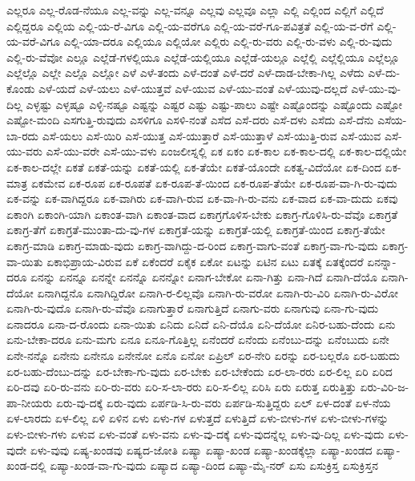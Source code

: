 {ಎಲ್ಲರೂ
ಎಲ್ಲ-ರೊಡ-ನೆಯೂ
ಎಲ್ಲ-ವನ್ನು
ಎಲ್ಲ-ವನ್ನೂ
ಎಲ್ಲವು
ಎಲ್ಲವೂ
ಎಲ್ಲಾ
ಎಲ್ಲಿ
ಎಲ್ಲಿಂದ
ಎಲ್ಲಿಗೆ
ಎಲ್ಲಿದೆ
ಎಲ್ಲಿದ್ದರೂ
ಎಲ್ಲಿಯ
ಎಲ್ಲಿ-ಯ-ರೆ-ವಿಗೂ
ಎಲ್ಲಿ-ಯ-ವರೆಗೂ
ಎಲ್ಲಿ-ಯ-ವರೆ-ಗೂ-ಪವಿತ್ರತೆ
ಎಲ್ಲಿ-ಯ-ವ-ರೆಗೆ
ಎಲ್ಲಿ-ಯ-ವರೆ-ವಿಗೂ
ಎಲ್ಲಿ-ಯಾ-ದರೂ
ಎಲ್ಲಿಯೂ
ಎಲ್ಲಿಯೋ
ಎಲ್ಲಿರು
ಎಲ್ಲಿ-ರು-ವರು
ಎಲ್ಲಿ-ರು-ವಳು
ಎಲ್ಲಿ-ರು-ವುದು
ಎಲ್ಲಿ-ರು-ವೆವೋ
ಎಲ್ಲೂ
ಎಲ್ಲೆಡೆ-ಗಳಲ್ಲಿಯೂ
ಎಲ್ಲೆಡೆ-ಯಲ್ಲಿಯೂ
ಎಲ್ಲೆಡೆ-ಯಲ್ಲೂ
ಎಲ್ಲೆಲ್ಲಿ
ಎಲ್ಲೆಲ್ಲಿಯೂ
ಎಲ್ಲೆಲ್ಲೂ
ಎಲ್ಲೆಲ್ಲೊ
ಎಲ್ಲೇ
ಎಲ್ಲೊ
ಎಲ್ಲೋ
ಎಳೆ
ಎಳೆ-ತಂದು
ಎಳೆ-ದಂತೆ
ಎಳೆ-ದರೆ
ಎಳೆ-ದಾಡ-ಬೇಕಾ-ಗಿಲ್ಲ
ಎಳೆದು
ಎಳೆ-ದು-ಕೊಂಡು
ಎಳೆ-ಯದೆ
ಎಳೆ-ಯಲು
ಎಳೆ-ಯುತ್ತವೆ
ಎಳೆ-ಯುವ
ಎಳೆ-ಯು-ವಂತೆ
ಎಳೆ-ಯುವು-ದಲ್ಲದೆ
ಎಳೆ-ಯು-ವು-ದಿಲ್ಲ
ಎಳ್ಳಷ್ಟು
ಎಳ್ಳಷ್ಟೂ
ಎಳ್ಳಿ-ನಷ್ಟೂ
ಎಷ್ಟನ್ನು
ಎಷ್ಟರ
ಎಷ್ಟು
ಎಷ್ಟು-ಪಾಲು
ಎಷ್ಟೇ
ಎಷ್ಟೊಂದನ್ನು
ಎಷ್ಟೊಂದು
ಎಷ್ಟೋ
ಎಷ್ಟೋ-ಮಂದಿ
ಎಸಗುತ್ತಿ-ರುವುದು
ಎಸಳಿಗೂ
ಎಸಳಿ-ನಂತೆ
ಎಸೆದ
ಎಸೆ-ದರು
ಎಸೆ-ದಳು
ಎಸೆದು
ಎಸೆ-ದೆನು
ಎಸೆಯ-ಬಾ-ರದು
ಎಸೆ-ಯಲು
ಎಸೆ-ಯಿರಿ
ಎಸೆ-ಯುತ್ತ
ಎಸೆ-ಯುತ್ತಾರೆ
ಎಸೆ-ಯುತ್ತಾಳೆ
ಎಸೆ-ಯುತ್ತಿ-ರುವ
ಎಸೆ-ಯುವ
ಎಸೆ-ಯು-ವರು
ಎಸೆ-ಯು-ವರೇ
ಎಸೆ-ಯು-ವಳು
ಏಂಜಲೀಸ್ನಲ್ಲಿ
ಏಕ
ಏಕಂ
ಏಕ-ಕಾಲ
ಏಕ-ಕಾಲ-ದಲ್ಲಿ
ಏಕ-ಕಾಲ-ದಲ್ಲಿಯೇ
ಏಕ-ಕಾಲ-ದಲ್ಲೇ
ಏಕತೆ
ಏಕತೆ-ಯನ್ನು
ಏಕತೆ-ಯಲ್ಲಿ
ಏಕ-ತೆಯೇ
ಏಕತೆ-ಯೊಂದೇ
ಏಕತ್ವ-ವಿದೆಯೋ
ಏಕ-ದಿಂದ
ಏಕ-ಮಾತ್ರ
ಏಕಮೇವ
ಏಕ-ರೂಪ
ಏಕ-ರೂಪತೆ
ಏಕ-ರೂಪ-ತೆ-ಯಿಂದ
ಏಕ-ರೂಪ-ತೆಯೇ
ಏಕ-ರೂಪ-ವಾ-ಗಿ-ರು-ವುದು
ಏಕ-ವನ್ನು
ಏಕ-ವಾಗಿದ್ದರೂ
ಏಕ-ವಾಗಿರು
ಏಕ-ವಾಗಿ-ರುವ
ಏಕ-ವಾ-ಗಿ-ರು-ವನು
ಏಕ-ವಾದ
ಏಕ-ವಾ-ದುದು
ಏಕವು
ಏಕಾಂಗಿ
ಏಕಾಂಗಿ-ಯಾಗಿ
ಏಕಾಂತ-ವಾಗಿ
ಏಕಾಂತ-ವಾದ
ಏಕಾಗ್ರಗೊಳಿಸ-ಬೇಕು
ಏಕಾಗ್ರ-ಗೊಳಿಸಿ-ರು-ವೆವೊ
ಏಕಾಗ್ರತೆ
ಏಕಾಗ್ರ-ತೆಗೆ
ಏಕಾಗ್ರತೆ-ಮುಂತಾ-ದು-ವು-ಗಳ
ಏಕಾಗ್ರತೆ-ಯನ್ನು
ಏಕಾಗ್ರತೆ-ಯಲ್ಲಿ
ಏಕಾಗ್ರತೆ-ಯಿಂದ
ಏಕಾಗ್ರ-ತೆಯೇ
ಏಕಾಗ್ರ-ಮಾಡಿ
ಏಕಾಗ್ರ-ಮಾಡು-ವುದು
ಏಕಾಗ್ರ-ವಾಗಿದ್ದು-ದ-ರಿಂದ
ಏಕಾಗ್ರ-ವಾಗು-ವಂತೆ
ಏಕಾಗ್ರ-ವಾ-ಗು-ವುದು
ಏಕಾಗ್ರ-ವಾ-ಯಿತು
ಏಕಾಭಿಪ್ರಾಯ-ವಿರುವ
ಏಕೆ
ಏಕೆಂದರೆ
ಏಕೈಕ
ಏಕೋ
ಏಟನ್ನು
ಏಟಿನ
ಏಟು
ಏತಕ್ಕೆ
ಏತಕ್ಕೆಂದರೆ
ಏನನ್ನಾ-ದರೂ
ಏನನ್ನು
ಏನನ್ನೂ
ಏನನ್ನೇ
ಏನನ್ನೊ
ಏನನ್ನೋ
ಏನಾಗ-ಬೇಕೋ
ಏನಾ-ಗಿತ್ತು
ಏನಾ-ಗಿದೆ
ಏನಾಗಿ-ದೆಯೊ
ಏನಾಗಿ-ದೆಯೋ
ಏನಾಗಿದ್ದನೊ
ಏನಾಗಿದ್ದಿರೋ
ಏನಾಗಿ-ರ-ಲಿಲ್ಲವೊ
ಏನಾಗಿ-ರು-ವರೋ
ಏನಾಗಿ-ರು-ವಿರಿ
ಏನಾಗಿ-ರು-ವಿರೋ
ಏನಾಗಿ-ರು-ವುದೊ
ಏನಾಗಿ-ರು-ವೆವೊ
ಏನಾಗುತ್ತಾರೆ
ಏನಾಗುತ್ತಿದೆ
ಏನಾಗು-ವರು
ಏನಾಗುವು
ಏನಾ-ಗು-ವುದು
ಏನಾದರೂ
ಏನಾ-ದ-ರೊಂದು
ಏನಾ-ಯಿತು
ಏನಿದು
ಏನಿದೆ
ಏನಿ-ದೆಯೊ
ಏನಿ-ದೆಯೋ
ಏನಿರ-ಬಹು-ದೆಂದು
ಏನು
ಏನು-ಬೇಕಾ-ದರೂ
ಏನು-ಮಗು
ಏನೂ
ಏನೂ-ಗೊತ್ತಿಲ್ಲ
ಏನೆಂದರೆ
ಏನೆಂದು
ಏನೆಂಬು-ದನ್ನು
ಏನೆಂಬುದು
ಏನೇ
ಏನೇ-ನನ್ನೊ
ಏನೇನು
ಏನೇನೂ
ಏನೇನೋ
ಏನೊ
ಏನೋ
ಏಪ್ರಿಲ್
ಏರ-ನೇರಿ
ಏರನ್ನು
ಏರ-ಬಲ್ಲರೊ
ಏರ-ಬಹುದು
ಏರ-ಬಹು-ದೆಂಬು-ದನ್ನು
ಏರ-ಬೇಕಾ-ಗು-ವುದು
ಏರ-ಬೇಕು
ಏರ-ಬೇಕೆಂದು
ಏರ-ಲಾ-ರರು
ಏರ-ಲಿಲ್ಲ
ಏರಿ
ಏರಿದ
ಏರಿ-ದವು
ಏರಿ-ರು-ವನು
ಏರಿ-ರು-ವರು
ಏರಿ-ಸ-ಲಾ-ರರು
ಏರಿ-ಸ-ಲಿಲ್ಲ
ಏರಿಸಿ
ಏರು
ಏರುತ್ತ
ಏರುತ್ತಿತ್ತು
ಏರು-ವಿರಿ-ಜ-ಪಾ-ನೀಯರು
ಏರು-ವು-ದಕ್ಕೆ
ಏರು-ವುದು
ಏರ್ಪಡಿ-ಸಿ-ರು-ವರು
ಏರ್ಪಡಿ-ಸುತ್ತಿದ್ದರು
ಏಲ್
ಏಳ-ದಂತೆ
ಏಳ-ನೆಯ
ಏಳ-ಲಾರದು
ಏಳ-ಲಿಲ್ಲ
ಏಳಿ
ಏಳಿನ
ಏಳು
ಏಳು-ಗಳ
ಏಳುತ್ತದೆ
ಏಳುತ್ತಿದೆ
ಏಳು-ಬೀಳು-ಗಳ
ಏಳು-ಬೀಳು-ಗಳನ್ನು
ಏಳು-ಬೀಳು-ಗಳು
ಏಳುವ
ಏಳು-ವಂತೆ
ಏಳು-ವನು
ಏಳು-ವು-ದಕ್ಕೆ
ಏಳು-ವುದನ್ನೆಲ್ಲ
ಏಳು-ವು-ದಿಲ್ಲ
ಏಳು-ವುದು
ಏಳು-ವುದೇ
ಏಳು-ವುವು
ಏಷ್ಯ-ಖಂಡವು
ಏಷ್ಯದ-ಜೋತಿ
ಏಷ್ಯಾ
ಏಷ್ಯಾ-ಖಂಡ
ಏಷ್ಯಾ-ಖಂಡಕ್ಕೆಲ್ಲಾ
ಏಷ್ಯಾ-ಖಂಡದ
ಏಷ್ಯಾ-ಖಂಡ-ದಲ್ಲಿ
ಏಷ್ಯಾ-ಖಂಡ-ವಾ-ಗು-ವುದು
ಏಷ್ಯಾದ
ಏಷ್ಯಾ-ದಿಂದ
ಏಷ್ಯಾ-ಮೈ-ನರ್
ಏಸು
ಏಸುಕ್ರಿಸ್ತ
ಏಸುಕ್ರಿಸ್ತನ
}

